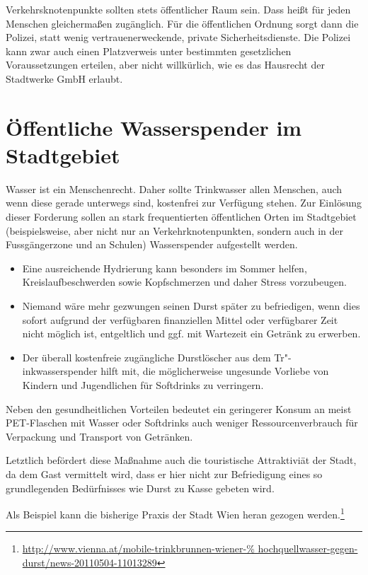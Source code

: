   Verkehrsknotenpunkte sollten stets öffentlicher Raum sein. Dass heißt für 
  jeden Menschen gleichermaßen zugänglich. Für die öffentlichen Ordnung sorgt 
  dann die Polizei, statt wenig vertrauenerweckende, private
  Sicherheitsdienste. Die Polizei kann zwar auch einen Platzverweis unter 
  bestimmten gesetzlichen Voraussetzungen erteilen, aber nicht willkürlich, 
  wie es das Hausrecht der Stadtwerke GmbH erlaubt.
  
  \section{Öffentliche Wasserspender im Stadtgebiet}
  
  Wasser ist ein Menschenrecht. Daher sollte Trinkwasser allen Menschen, auch 
  wenn diese gerade unterwegs sind, kostenfrei zur Verfügung stehen. Zur 
  Einlösung dieser Forderung sollen an stark frequentierten öffentlichen Orten 
  im Stadtgebiet (beispielsweise, aber nicht nur an Verkehrknotenpunkten, sondern auch in 
  der Fussgängerzone und an Schulen) Wasserspender aufgestellt werden.
    
  \begin{itemize}
    \item Eine ausreichende Hydrierung kann besonders im Sommer helfen, 
          Kreislaufbeschwerden sowie Kopfschmerzen und daher Stress 
          vorzubeugen.
    \item Niemand wäre mehr gezwungen seinen Durst später zu befriedigen, wenn
          dies sofort aufgrund der verfügbaren finanziellen Mittel oder 
          verfügbarer Zeit nicht möglich ist, entgeltlich und ggf. mit 
          Wartezeit ein Getränk zu erwerben.
    \item Der überall kostenfreie zugängliche Durstlöscher aus dem 
          Tr"-inkwasserspender hilft mit, die möglicherweise ungesunde 
          Vorliebe von Kindern und Jugendlichen für Softdrinks zu verringern. 
  \end{itemize}
  
  Neben den gesundheitlichen Vorteilen bedeutet ein geringerer Konsum an meist 
  PET-Flaschen mit Wasser oder Softdrinks auch weniger Ressourcenverbrauch für 
  Verpackung und Transport von Getränken.
  
  Letztlich befördert diese Maßnahme auch die touristische Attraktiviät der 
  Stadt, da dem Gast vermittelt wird, dass er hier nicht zur Befriedigung 
  eines so grundlegenden Bedürfnisses wie Durst zu Kasse gebeten wird.
  
  Als Beispiel kann die bisherige Praxis der Stadt Wien heran gezogen 
  werden.\footnote{\url{http://www.vienna.at/mobile-trinkbrunnen-wiener-%
      hochquellwasser-gegen-durst/news-20110504-11013289}}
